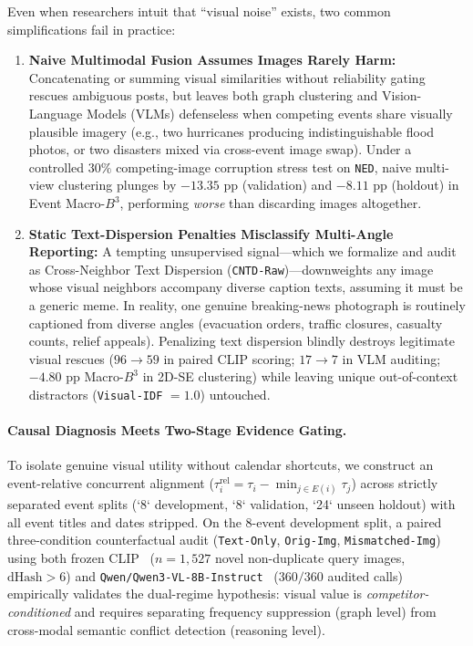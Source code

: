Even when researchers intuit that ``visual noise'' exists, two common simplifications fail in practice:
\begin{enumerate}
    \item \textbf{Naive Multimodal Fusion Assumes Images Rarely Harm:} Concatenating or summing visual similarities without reliability gating rescues ambiguous posts, but leaves both graph clustering and Vision-Language Models (VLMs) defenseless when competing events share visually plausible imagery (e.g., two hurricanes producing indistinguishable flood photos, or two disasters mixed via cross-event image swap). Under a controlled $30\%$ competing-image corruption stress test on \texttt{NED}, naive multi-view clustering plunges by $-13.35\text{ pp}$ (validation) and $-8.11\text{ pp}$ (holdout) in Event Macro-$B^3$, performing \emph{worse} than discarding images altogether.
    \item \textbf{Static Text-Dispersion Penalties Misclassify Multi-Angle Reporting:} A tempting unsupervised signal---which we formalize and audit as Cross-Neighbor Text Dispersion (\texttt{CNTD-Raw})---downweights any image whose visual neighbors accompany diverse caption texts, assuming it must be a generic meme. In reality, one genuine breaking-news photograph is routinely captioned from diverse angles (evacuation orders, traffic closures, casualty counts, relief appeals). Penalizing text dispersion blindly destroys legitimate visual rescues ($96 \to 59$ in paired CLIP scoring; $17 \to 7$ in VLM auditing; $-4.80\text{ pp}$ Macro-$B^3$ in 2D-SE clustering) while leaving unique out-of-context distractors (\texttt{Visual-IDF} $= 1.0$) untouched.
\end{enumerate}

\paragraph{Causal Diagnosis Meets Two-Stage Evidence Gating.}
To isolate genuine visual utility without calendar shortcuts, we construct an event-relative concurrent alignment ($\tau^{\text{rel}}_i = \tau_i - \min_{j \in E(i)} \tau_j$) across strictly separated event splits (`8` development, `8` validation, `24` unseen holdout) with all event titles and dates stripped. On the 8-event development split, a paired three-condition counterfactual audit (\texttt{Text-Only}, \texttt{Orig-Img}, \texttt{Mismatched-Img}) using both frozen CLIP~\cite{radford2021clip} ($n=1{,}527$ novel non-duplicate query images, $\mathrm{dHash} > 6$) and \texttt{Qwen/Qwen3-VL-8B-Instruct}~\cite{bai2025qwen3vl} ($360/360$ audited calls) empirically validates the dual-regime hypothesis: visual value is \emph{competitor-conditioned} and requires separating frequency suppression (graph level) from cross-modal semantic conflict detection (reasoning level).

